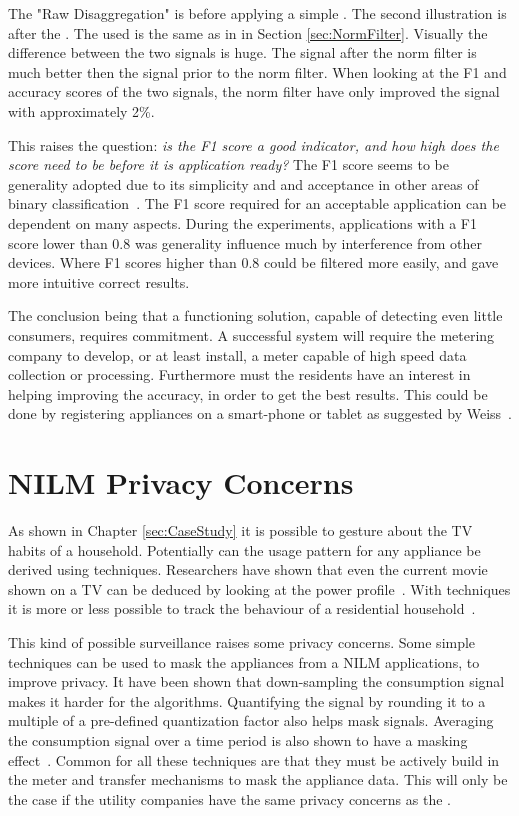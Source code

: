 The "Raw Disaggregation" is before applying a simple . The second illustration is after the . The  used is the same as in in Section \ref{sec:NormFilter}. Visually the difference between the two signals is huge. The signal after the norm filter is much better then the signal prior to the norm filter. When looking at the F1 and accuracy scores of the two signals, the norm filter have only improved the signal with approximately 2\%.  

This raises the question: \textit{is the F1 score a good indicator, and how high does the score need to be before it is application ready?} The F1 score seems to be generality adopted due to its simplicity and and acceptance in other areas of binary classification~\citep{RefWorks:35}. The F1 score required for an acceptable application can be dependent on many aspects. During the experiments, applications with a F1 score lower than 0.8 was generality influence much by interference from other devices. Where F1 scores higher than 0.8 could be filtered more easily, and gave more intuitive correct results.  

The conclusion being that a functioning  solution, capable of detecting even little consumers, requires commitment. A successful system will require the metering company to develop, or at least install, a meter capable of high speed data collection or processing. Furthermore must the residents have an interest in helping improving the accuracy, in order to get the best results. This could be done by registering appliances on a smart-phone or tablet as suggested by Weiss~\citep{RefWorks:23}.

\section{NILM Privacy Concerns}
As shown in Chapter \ref{sec:CaseStudy} it is possible to gesture about the TV habits of a household. Potentially can the usage pattern for any appliance be derived using  techniques. Researchers have shown that even the current movie shown on a TV can be deduced by looking at the power profile~\citep{RefWorks:39}. With  techniques it is more or less possible to track the behaviour of a residential household~\citep{RefWorks:37}.

This kind of possible surveillance raises some privacy concerns. Some simple techniques can be used to mask the appliances from a NILM applications, to improve privacy. It have been shown that down-sampling the consumption signal makes it harder for the  algorithms. Quantifying the signal by rounding it to a multiple of a pre-defined quantization factor also helps mask signals. Averaging the consumption signal over a time period is also shown to have a masking effect~\citep{RefWorks:40}. Common for all these techniques are that they must be actively build in the meter and transfer mechanisms to mask the appliance data. This will only be the case if the utility companies have the same privacy concerns as the . 

